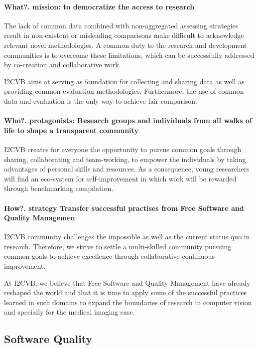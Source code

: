 \paragraph{What?. mission: to democratize the access to research}
The lack of common data combined with non-aggregated assessing strategies result in non-existent or misleading comparisons make difficult to acknowledge relevant novel methodologies. A common duty to the research and development communities is to overcome these limitations, which can be successfully addressed by co-creation and collaborative work.

I2CVB aims at serving as foundation for collecting and sharing data as well as providing common evaluation methodologies. Furthermore, the use of common data and evaluation is the only way to achieve fair comparison.

\paragraph{Who?. protagonists: Research groups and individuals from all walks of life to shape a transparent community}
I2CVB creates for everyone the opportunity to pursue common goals through sharing, collaborating and team-working, to empower the individuals by taking advantages of personal skills and resources. As a consequence, young researchers will find an eco-system for self-improvement in which work will be rewarded through benchmarking compilation.

\paragraph{How?. strategy Transfer successful practises from Free Software and Quality Managemen}
I2CVB community challenges the impossible as well as the current status quo in research. Therefore, we strive to settle a multi-skilled community pursuing common goals to achieve excellence through collaborative continuous improvement.

At I2CVB, we believe that Free Software and Quality Management have already reshaped the world and that it is time to apply some of the successful practices learned in such domains to expand the boundaries of research in computer vision and specially for the medical imaging case.

\subsection{Software Quality}

